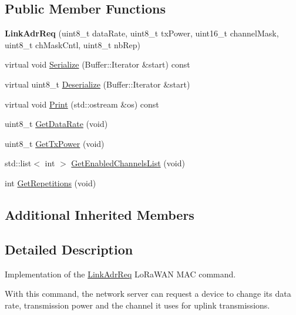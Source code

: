 \subsection*{Public Member Functions}
\begin{DoxyCompactItemize}
\item 
\mbox{\label{classns3_1_1lorawan_1_1LinkAdrReq_a7eac381198a10a3e1ee4467d519a129a}} 
{\bfseries Link\+Adr\+Req} (uint8\+\_\+t data\+Rate, uint8\+\_\+t tx\+Power, uint16\+\_\+t channel\+Mask, uint8\+\_\+t ch\+Mask\+Cntl, uint8\+\_\+t nb\+Rep)
\item 
virtual void \hyperlink{classns3_1_1lorawan_1_1LinkAdrReq_a92d99d7a9893de77be8bd14ef0109c53}{Serialize} (Buffer\+::\+Iterator \&start) const
\item 
virtual uint8\+\_\+t \hyperlink{classns3_1_1lorawan_1_1LinkAdrReq_abd1ff0ffcc32ec6a768e12eb18df2cee}{Deserialize} (Buffer\+::\+Iterator \&start)
\item 
virtual void \hyperlink{classns3_1_1lorawan_1_1LinkAdrReq_aa6f8732a740ae000006f56fd605cfaf4}{Print} (std\+::ostream \&os) const
\item 
uint8\+\_\+t \hyperlink{classns3_1_1lorawan_1_1LinkAdrReq_a21c567d9b65c39406555d42450d78018}{Get\+Data\+Rate} (void)
\item 
uint8\+\_\+t \hyperlink{classns3_1_1lorawan_1_1LinkAdrReq_a723eef40c7a4bba6f48d7ad61c2b9c12}{Get\+Tx\+Power} (void)
\item 
std\+::list$<$ int $>$ \hyperlink{classns3_1_1lorawan_1_1LinkAdrReq_a83aa5c208fb78807413451a87d67b6ec}{Get\+Enabled\+Channels\+List} (void)
\item 
int \hyperlink{classns3_1_1lorawan_1_1LinkAdrReq_acc3255bb562164ddd433f929e23a14d8}{Get\+Repetitions} (void)
\end{DoxyCompactItemize}
\subsection*{Additional Inherited Members}


\subsection{Detailed Description}
Implementation of the \hyperlink{classns3_1_1lorawan_1_1LinkAdrReq}{Link\+Adr\+Req} Lo\+Ra\+W\+AN M\+AC command.

With this command, the network server can request a device to change its data rate, transmission power and the channel it uses for uplink transmissions. 


